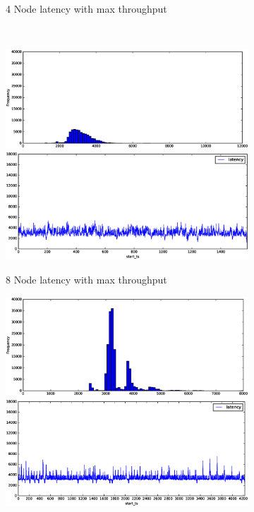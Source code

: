 \begin{figure}
\begin{subfigure}[b]{0.3\textwidth}
        \caption{4 Node latency with max throughput }
    \end{subfigure}
    ~ 
    \begin{subfigure}[b]{0.3\textwidth}
        \includegraphics[width=\textwidth]{eps/spark_agg_8node_th_max_hist}
         \includegraphics[width=\textwidth]{eps/spark_agg_8node_th_max_ts}

        \caption{8 Node latency with max throughput }
    \end{subfigure}




    \begin{subfigure}[b]{0.3\textwidth}
        \includegraphics[width=\textwidth]{eps/spark_agg_2node_th_90_hist}
         \includegraphics[width=\textwidth]{eps/spark_agg_2node_th_90_ts}


\end{subfigure}
\end{figure}
